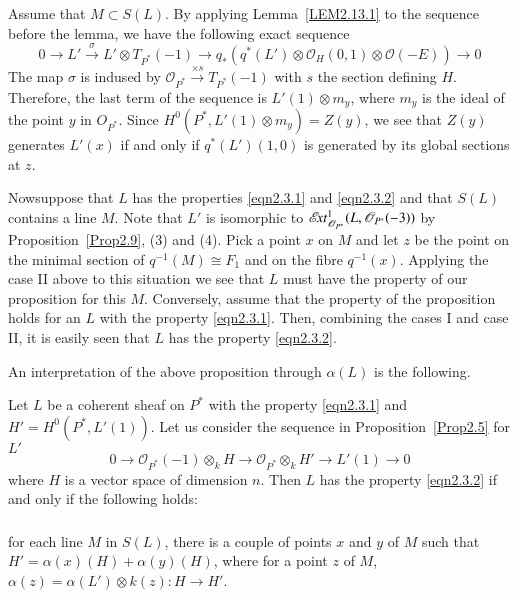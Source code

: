 \begin{case}%
Assume that $M\subset S(L)$. By applying Lemma~\ref{LEM2.13.1} to the
sequence before the lemma, we have the following exact sequence 
$$
0\to L'\xrightarrow{\sigma}L'\otimes T_{P^{\ast}}(-1)\to
q_{\ast}(q^{\ast}(L')\otimes \mathscr{O}_{H}(0,1)\otimes
\mathscr{O}(-E))\to 0
$$
The map $\sigma$ is indused by
$\mathscr{O}_{P^{\ast}}\xrightarrow{\times s}T_{P^{\ast}}(-1)$ with
$s$ the section defining $H$. Therefore, the last term of the sequence
is $L'(1)\otimes m_y$, where $m_y$ is the ideal of the point $y$ in
$O_{P^{\ast}}$. Since $H^{0}(P^{\ast},L'(1)\otimes m_y)=Z(y)$, we see
that $Z(y)$ generates $L'(x)$ if and only if $q^{\ast}(L')(1,0)$ is
generated by its global sections at $z$. 

Now\pageoriginale suppose that $L$ has the properties \eqref{eqn2.3.1} and
\eqref{eqn2.3.2} and that $S(L)$ contains a line $M$. Note that $L'$
is isomorphic to
$\mathscr{E}\!{\it xt}^{1}_{\mathscr{O}_{P^{\ast}}}(L,\mathscr{O}_{P^{\ast}}(-3))$ by
Proposition~\ref{Prop2.9}, (3) and (4). Pick a point $x$ on $M$ and
let $z$ be the point on the minimal section of $q^{-1}(M)\cong F_1$
and on the fibre $q^{-1}(x)$. Applying the case II above to this
situation we see that $L$ must have the property of our proposition
for this $M$. Conversely, assume that the property of the proposition
holds for an $L$ with the property \eqref{eqn2.3.1}. Then, combining
the cases I and case II, it is easily seen that $L$ has the property \eqref{eqn2.3.2}.
\end{case}

An interpretation of the above proposition through $\alpha(L)$ is the
following.

\begin{cor}\label{cor2.13.2}
Let $L$ be a coherent sheaf on $P^{\ast}$ with the property
\eqref{eqn2.3.1} and $H'=H^{0}(P^{\ast},L'(1))$. Let us consider the
sequence in Proposition~\ref{Prop2.5} for $L'$
$$
0\to \mathscr{O}_{P^{\ast}}(-1)\otimes_k H\to
\mathscr{O}_{P^{\ast}}\otimes_k H'\to L'(1)\to 0
$$
where $H$ is a vector space of dimension $n$. Then $L$ has the
property \eqref{eqn2.3.2} if and only if the following holds: 
\end{cor}

\setcounter{subsection}{13}
\setcounter{subsubsection}{2}
\subsubsection{}\label{eqn2.13.3}
for each line  $M$ in $S(L)$, there is a couple of
points $x$ and $y$ of $M$ such that $H'=\alpha(x)(H)+\alpha(y)(H)$,
where for a point $z$ of $M$, $\alpha(z)=\alpha(L')\otimes k(z):H\to
H'$.

